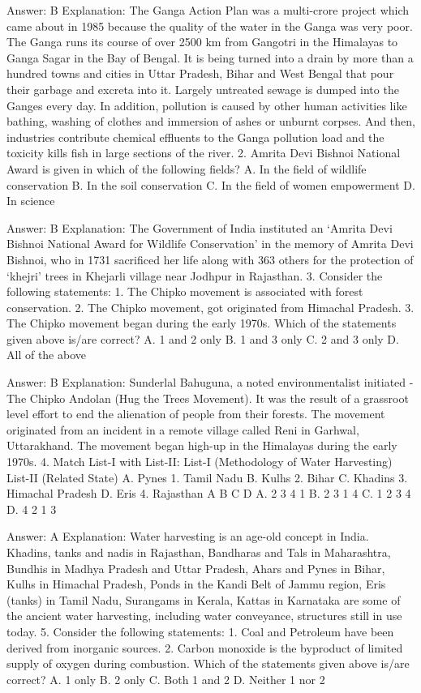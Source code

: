 Answer: B
Explanation: The Ganga Action Plan was a multi-crore project which came about in 1985 because the quality of the water in the Ganga was very poor. The Ganga runs its course of over 2500 km from Gangotri in the Himalayas to Ganga Sagar in the Bay of Bengal. It is being turned into a drain by more than a hundred towns and cities in Uttar Pradesh, Bihar and West Bengal that pour their garbage and excreta into it. Largely untreated sewage is dumped into the Ganges every day. In addition, pollution is caused by other human activities like bathing, washing of clothes and immersion of ashes or unburnt corpses. And then, industries contribute chemical effluents to the Ganga pollution load and the toxicity kills fish in large sections of the river. 2. Amrita Devi Bishnoi National Award is given in which of the following fields? A. In the field of wildlife conservation B. In the soil conservation C. In the field of women empowerment D. In science 

Answer: B
Explanation: The Government of India instituted an ‘Amrita Devi Bishnoi National Award for Wildlife Conservation’ in the memory of Amrita Devi Bishnoi, who in 1731 sacrificed her life along with 363 others for the protection of ‘khejri’ trees in Khejarli village near Jodhpur in Rajasthan. 3. Consider the following statements: 1. The Chipko movement is associated with forest conservation. 2. The Chipko movement, got originated from Himachal Pradesh. 3. The Chipko movement began during the early 1970s. Which of the statements given above is/are correct? A. 1 and 2 only B. 1 and 3 only C. 2 and 3 only D. All of the above 

Answer: B
Explanation: Sunderlal Bahuguna, a noted environmentalist initiated - The Chipko Andolan (Hug the Trees Movement). It was the result of a grassroot level effort to end the alienation of people from their forests. The movement originated from an incident in a remote village called Reni in Garhwal, Uttarakhand. The movement began high-up in the Himalayas during the early 1970s. 4. Match List-I with List-II: List-I (Methodology of Water Harvesting) List-II (Related State) A. Pynes 1. Tamil Nadu B. Kulhs 2. Bihar C. Khadins 3. Himachal Pradesh D. Eris 4. Rajasthan A B C D A. 2 3 4 1 B. 2 3 1 4 C. 1 2 3 4 D. 4 2 1 3 

Answer: A
Explanation: Water harvesting is an age-old concept in India. Khadins, tanks and nadis in Rajasthan, Bandharas and Tals in Maharashtra, Bundhis in Madhya Pradesh and Uttar Pradesh, Ahars and Pynes in Bihar, Kulhs in Himachal Pradesh, Ponds in the Kandi Belt of Jammu region, Eris (tanks) in Tamil Nadu, Surangams in Kerala, Kattas in Karnataka are some of the ancient water harvesting, including water conveyance, structures still in use today. 5. Consider the following statements: 1. Coal and Petroleum have been derived from inorganic sources. 2. Carbon monoxide is the byproduct of limited supply of oxygen during combustion. Which of the statements given above is/are correct? A. 1 only B. 2 only C. Both 1 and 2 D. Neither 1 nor 2 

